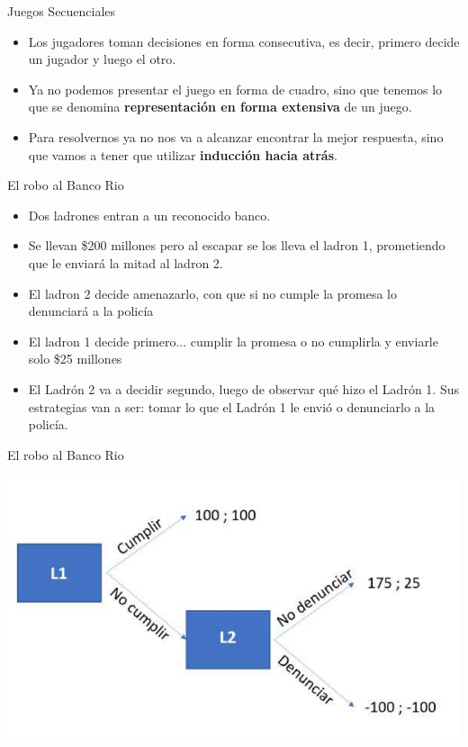 \documentclass{beamer}
\begin{document}
\begin{frame}{Juegos Secuenciales}
    \begin{itemize}
        \item Los jugadores toman decisiones en forma consecutiva, es decir, primero decide un jugador y luego el otro.
        \item Ya no podemos presentar el juego en forma de cuadro, sino que tenemos lo que se denomina \textbf{representación en forma extensiva} de un juego.
        \item Para resolvernos ya no nos va a alcanzar encontrar la mejor respuesta, sino que vamos a tener que utilizar \textbf{inducción hacia atrás}.
    \end{itemize}
\end{frame}

\begin{frame}{El robo al Banco Rio}
    \begin{itemize}
        \item Dos ladrones entran a un reconocido banco.
        \item Se llevan \$200 millones pero al escapar se los lleva el ladron 1, prometiendo que le enviará la mitad al ladron 2.
        \item El ladron 2 decide amenazarlo, con que si no cumple la promesa lo denunciará a la policía
        \item El ladron 1 decide primero... cumplir la promesa o no cumplirla y enviarle solo \$25 millones 
        \item El Ladrón 2 va a decidir segundo, luego de observar qué hizo el Ladrón 1. Sus estrategias van a ser: tomar lo que el Ladrón 1 le envió o denunciarlo a la policía.
    \end{itemize}
\end{frame}

\begin{frame}{El robo al Banco Rio}
    \begin{center}
        \includegraphics[scale=0.6]{../Figures/C20.2.png}
    \end{center}
\end{frame}
\end{document}
